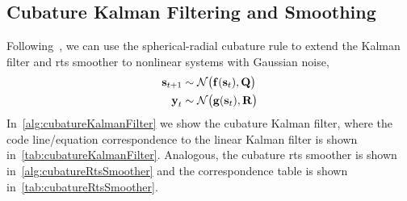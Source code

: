 	\subsection{Cubature Kalman Filtering and Smoothing}
		\label{subsec:cubatureFiltering}

		Following~\cite{deisenrothProbabilisticPerspectiveGaussian2011,solinCubatureIntegrationMethods2010}, we can use the spherical-radial cubature rule to extend the Kalman filter and \ac{rts} smoother to nonlinear systems with Gaussian noise, \ie
		\begin{align*}
			\boldsymbol{\mathrm{s}}_{t + 1} &\sim \mathcal{N}\big( \boldsymbol{\mathrm{f}}(\boldsymbol{\mathrm{s}}_t), \boldsymbol{\mathrm{Q}} \big) \\
			\boldsymbol{\mathrm{y}}_t &\sim \mathcal{N}\big( \boldsymbol{\mathrm{g}}(\boldsymbol{\mathrm{s}}_t), \boldsymbol{\mathrm{R}} \big)
		\end{align*}
		In~\autoref{alg:cubatureKalmanFilter} we show the cubature Kalman filter, where the code line/equation correspondence to the linear Kalman filter is shown in~\autoref{tab:cubatureKalmanFilter}. Analogous, the cubature \ac{rts} smoother is shown in~\autoref{alg:cubatureRtsSmoother} and the correspondence table is shown in~\autoref{tab:cubatureRtsSmoother}.


